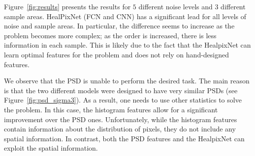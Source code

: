 \documentclass[final,twocolumn,3p,times,authoryear]{elsarticle}
\newcommand{\nati}[1]{{\color[rgb]{.1,.6,.1}{#1}}}
\newcommand{\TK}[1]{{\color{red}{TK:#1}}}
\newcommand{\figref}[1]{Figure~\ref{fig:#1}}
\newcommand{\1}{\b{1}}              %
\newcommand{\0}{\b{0}}              %
\begin{document}
\figref{results} presents the results for $5$ different noise levels and $3$ different sample areas.
HealPixNet (FCN and CNN) has a significant lead for all levels of noise and sample areas.
In particular, the difference seems to increase as the problem becomes more complex; as the order is increased, there is less information in each sample.
This is likely due to the fact that the HealpixNet can learn optimal features for the problem and does not rely on hand-designed features. 

We observe that the PSD is unable to perform the desired task.
The main reason is that the two different models were designed to have very similar PSDs (see \figref{psd_sigma3}).
As a result, one needs to use other statistics to solve the problem.
In this case, the histogram features allow for a significant improvement over the PSD ones.
Unfortunately, while the histogram features contain information about the distribution of pixels, they do not include any spatial information.
In contrast, both the PSD features and the HealpixNet can exploit the spatial information. 

\end{document}
